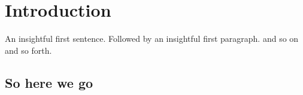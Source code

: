
\chapter{Introduction}

An insightful first sentence. Followed by an insightful first paragraph. and so on and so forth.

\section{So here we go}
